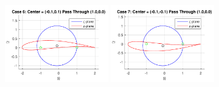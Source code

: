 \documentclass[letterpaper,12pt,]{article}
\begin{document}
\begin{figure}[h!]
  \includegraphics[width=0.40\textwidth]{case6}
  \includegraphics[width=0.40\textwidth]{case7}
\end{figure}
\end{document}
